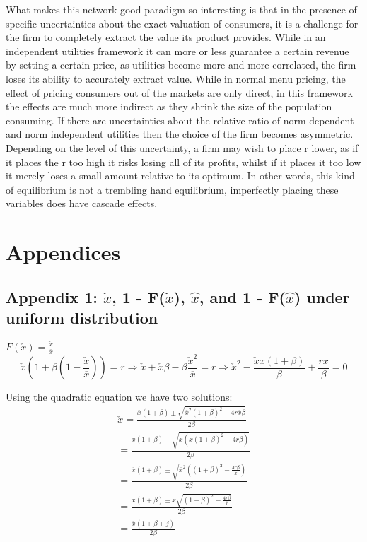\documentclass{article}
\begin{document}
What makes this network good paradigm so interesting is that in the presence of specific uncertainties about the exact valuation of consumers, it is a challenge for the firm to completely extract the value its product provides. While in an independent utilities framework it can more or less guarantee a certain revenue by setting a certain price, as utilities become more and more correlated, the firm loses its ability to accurately extract value. While in normal menu pricing, the effect of pricing consumers out of the markets are only direct, in this framework the effects are much more indirect as they shrink the size of the population consuming. If there are uncertainties about the relative ratio of norm dependent and norm independent utilities then the choice of the firm becomes asymmetric. Depending on the level of this uncertainty, a firm may wish to place r lower, as if it places the r too high it risks losing all of its profits, whilst if it places it too low it merely loses a small amount relative to its optimum. In other words, this kind of equilibrium is not a trembling hand equilibrium, imperfectly placing these variables does have cascade effects. 





\section{Appendices}
\subsection{Appendix 1: $\check{x}$, 1 - F($\check{x}$), $\hat{x}$, and 1 - F($\hat{x}$)  under uniform distribution}
$F(\check{x})=\frac{\check{x}}{\overline{x}}$
\[
\check{x}(1 + \beta (1-\frac{\check{x}}{\overline{x}})) = r
\Rightarrow \check{x} +\check{x}\beta - \beta \frac{\check{x}^2}{\overline{x}} = r
\Rightarrow \check{x}^2-\frac{\check{x} \overline{x}(1+\beta)}{\beta} + \frac{r \overline{x}}{\beta} = 0
\]

Using the quadratic equation we have two solutions: 
\[
\begin{array}{ll}
\check{x} = \frac{\overline{x}(1+\beta) \pm \sqrt{\overline{x}^{2}(1+\beta)^{2}-4 r \overline{x} \beta}}{2 \beta} \\
= \frac{\overline{x}(1+\beta) \pm \sqrt{ \overline{x}(\overline{x}(1+\beta)^{2}-4 r \beta) }}{2 \beta} \\
= \frac{\overline{x}(1+\beta) \pm \sqrt{ \overline{x}^{2}((1+\beta)^{2}- \frac{4 r \beta}{\overline{x}}) }}{2 \beta} \\
= \frac{\overline{x}(1+\beta) \pm \overline{x} \sqrt{ (1+\beta)^{2}- \frac{4 r \beta}{\overline{x}} }}{2 \beta} \\
= \frac{\overline{x}(1+\beta + j)}{2 \beta}
\end{array}
\]
\end{document}
